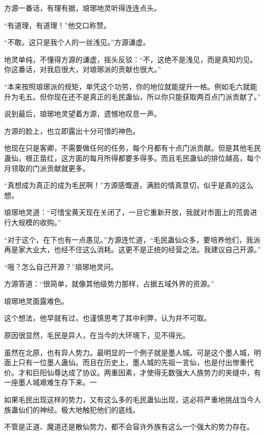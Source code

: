 
\begin{this_body}



方源一番话，有理有据，琅琊地灵听得连连点头。

“有道理，有道理！”他交口称赞。

“不敢。这只是我个人的一丝浅见。”方源谦虚。

地灵单纯，不懂得方源的谦虚，摇头反驳：“不，这绝不是浅见，而是真知灼见。你这番话，对我启很大，对琅琊派的贡献也很大。”

“本来按照琅琊派的规矩，单凭这个功劳，你的地位就能提升一格。例如毛六就能升为毛五。但你现在还不是真正的毛民蛊仙，所以你只能获取两百点门派贡献了。”

说到最后，琅琊地灵望着方源，遗憾地叹息一声。

方源的脸上，也立即露出十分可惜的神色。

他现在只是客卿，不需要做任何的任务，每个月都有十点门派贡献。但是其他毛民蛊仙，根正苗红，这方面的每月所得都要多得多。而且毛民蛊仙的排位越高，每个月领取的门派贡献就更多。

“真想成为真正的成为毛民啊！”方源感慨道，满脸的情真意切，似乎是真的这么想。

琅琊地灵道：“可惜宝黄天现在关闭了，一旦它重新开放，我就对市面上的荒兽进行大规模的收购。”

“对于这个，在下也有一点愚见。”方源连忙道，“毛民蛊仙众多，要培养他们，我派再是家大业大，也经不住这么消耗。这更不是正统的经营之法。我建议自己开源。”

“哦？怎么自己开源？”琅琊地灵问。

方源答道：“很简单，就像其他级势力那样，占据五域外界的资源。”

琅琊地灵面露难色。

这个想法，他早就有过，也谨慎思考了其中利弊，认为并不可取。

原因很显然，毛民是异人，在当今的大环境下，见不得光。

虽然在北原，也有异人势力。最明显的一个例子就是墨人城。可是这个墨人城，明面上只有一位墨人蛊仙。而且在历史上，墨人城的先祖一言仙，也是付出惨重代价。才和巨阳仙尊达成了协议。两重因素，才使得无数强大人族势力的夹缝中，有一座墨人城艰难生存下来。一

如果毛民出现这样的势力，又有这么多的毛民蛊仙出现，这必将严重地挑战当今人族蛊仙们的神经。极大地触犯他们的底线。

不管是正道、魔道还是散仙势力，都不会容许外族有这么一个强大的势力存在。


\end{this_body}
